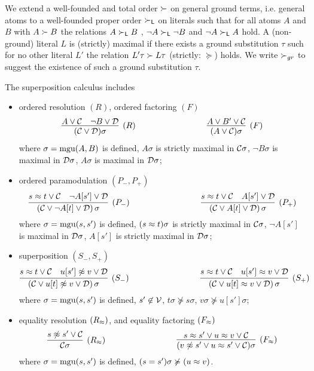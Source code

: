 
\begin{definition}\label{def:orders-on-literals}
	We extend a well-founded and total order $\succ$ on general ground terms, i.e. general atoms 
	to a well-founded proper order $\succ_{\mathsf L}$ on literals such that for all atoms $A$ and $B$ with $A\succ B$ 
	the relations $A\succ_{\mathsf L} B$ , 
	$\lnot A\succ_{\mathsf L}\lnot B$ and 
	$\lnot A\succ_{\mathsf L} A$ hold. 
	A (non-ground) literal $L$ is {\myem (strictly) maximal} if there exists a ground substitution $\tau$ 
	such for no other literal $L'$ the relation $L'\tau\succ L\tau$ (strictly: $\succcurlyeq$) holds.
	We write $\succ_{gr}$ to suggest the existence of such a ground substitution $\tau$.
\end{definition}
\begin{definition}\label{def:superposition-calculus}
	The {\myem superposition calculus} includes
	\begin{itemize}
		\item ordered resolution $(R)$,
		ordered factoring $(F)$
		\begin{gather*}
		\infer
		[(R)]
		{(\mcC \lor \mcD)\sigma}
		{{ A} \lor\mcC & { \lnot B} \lor\mcD}
		\hspace{3cm}
		\infer
		[(F)]
		{(A \lor \mcC)\sigma}
		{{ A}\lor B'\lor\mcC}
		\end{gather*}
		where
		$\sigma=\operatorname{mgu}(A,B)$ is defined, 
		$A\sigma$ { is strictly maximal} in ${\mathcal C}\sigma$,
		$\lnot B\sigma$ { is maximal} in ${\mathcal D}\sigma$, 
		$A\sigma$ is maximal in ${\mathcal D}\sigma$;
		\item ordered paramodulation $(P_-,P_+)$
		\[
		\infer
		[(P_-)]
		{(\mcC\lor \lnot A[t]\lor\mcD)\,\sigma}
		{{ s\mEQ t} \lor\mcC\quad { \lnot A[s']}\lor\mcD}
		\hspace{3cm}
		\infer
		[(P_+)]
		{(\mcC\lor A[t]\lor\mcD)\,\sigma}
		{{ s\mEQ t} \lor\mcC\quad { A[s']}\lor\mcD}
		\]
		where $\sigma=\operatorname{mgu}(s,s')$ is defined, 
		$(s\approx t)\sigma$ { is strictly maximal} in ${\mathcal C}\sigma$, 
		$\lnot A[s']$ { is maximal} in ${\mathcal D}\sigma$,
		$A[s']$ { is strictly maximal} in ${\mathcal D}\sigma$;
		\item superposition $(S_-,S_+)$
		\[
		\infer
		[(S_-)]
		{(\mcC\lor u[t]\mNE v\lor\mcD)\,\sigma}
		{{ s\mEQ t}\lor\mcC\quad { u[s']\mNE v}\lor\mcD}
		\hspace{3cm}
		\infer
		[(S_+)]
		{(\mcC\lor u[t]\mEQ v\lor\mcD)\,\sigma}
		{{ s\mEQ t}\lor\mcC\quad { u[s']\mEQ v}\lor\mcD}
		\]
		where $\sigma=\operatorname{mgu}(s,s')$ is defined,
		$s'\not\in{\mathcal V}$, 
		$t\sigma\not\succcurlyeq s\sigma$,
		$v\sigma\not\succcurlyeq u[s']\sigma$;
		\item 
		equality resolution $(R_\approx )$,
		and equality factoring $(F_\approx )$
		\[
		\infer
		[(R_\mEQ)]
		{\mcC\sigma}
		{{ s\mNE s'}\lor\mcC}
		\hspace{3cm}
		\infer
		[(F_\mEQ)]
		{(v\mNE s'\lor u\mEQ s'\lor\mcC)\sigma}
		{{s\mEQ s'}\lor { u\mEQ v}\lor\mcC}
		\]
		where 
		$\sigma=\operatorname{mgu}(s,s')$ is defined,
		$(s=s')\sigma\not\succcurlyeq(u\approx v)$.
	\end{itemize}
\end{definition}

